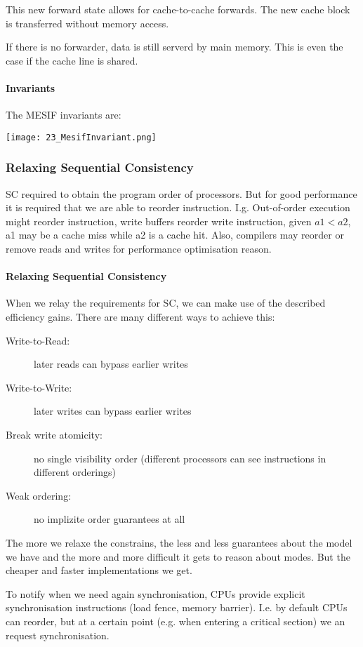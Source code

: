 This new forward state allows for cache-to-cache forwards. The new cache block is transferred without memory access.

If there is no forwarder, data is still serverd by main memory. This is even the case if the cache line is shared.

\paragraph{Invariants}
The MESIF invariants are:

\texttt{[image: 23\_MesifInvariant.png]}

\subsubsection{Relaxing Sequential Consistency}
SC required to obtain the program order of processors. But for good performance it is required that we are able to reorder instruction. I.g. Out-of-order execution might reorder instruction, write buffers reorder write instruction, given $a1 < a2$, a1 may be a cache miss while a2 is a cache hit. Also, compilers may reorder or remove reads and writes for performance optimisation reason.

\paragraph{Relaxing Sequential Consistency}
When we relay the requirements for SC, we can make use of the described efficiency gains. There are many different ways to achieve this:
\begin{description}
    \item[Write-to-Read:] later reads can bypass earlier writes
    \item[Write-to-Write:] later writes can bypass earlier writes
    \item[Break write atomicity:] no single visibility order (different processors can see instructions in different orderings)
    \item[Weak ordering:] no implizite order guarantees at all
\end{description}

The more we relaxe the constrains, the less and less guarantees about the model we have and the more and more difficult it gets to reason about modes. But the cheaper and faster implementations we get.

To notify when we need again synchronisation, CPUs provide explicit synchronisation instructions (load fence, memory barrier). I.e. by default CPUs can reorder, but at a certain point (e.g. when entering a critical section) we an request synchronisation.

